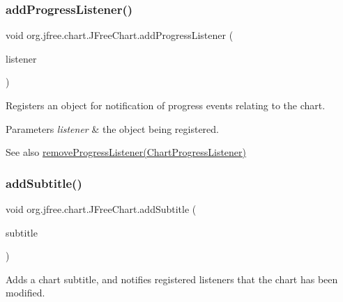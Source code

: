 \subsubsection{\texorpdfstring{add\+Progress\+Listener()}{addProgressListener()}}
{\footnotesize\ttfamily void org.\+jfree.\+chart.\+J\+Free\+Chart.\+add\+Progress\+Listener (\begin{DoxyParamCaption}\item[{\mbox{\hyperlink{interfaceorg_1_1jfree_1_1chart_1_1event_1_1_chart_progress_listener}{Chart\+Progress\+Listener}}}]{listener }\end{DoxyParamCaption})}

Registers an object for notification of progress events relating to the chart.


\begin{DoxyParams}{Parameters}
{\em listener} & the object being registered.\\
\hline
\end{DoxyParams}
\begin{DoxySeeAlso}{See also}
\mbox{\hyperlink{classorg_1_1jfree_1_1chart_1_1_j_free_chart_a4e49f1c4b7ed4328f29cac2c6a4f5a09}{remove\+Progress\+Listener(\+Chart\+Progress\+Listener)}} 
\end{DoxySeeAlso}
\mbox{\label{classorg_1_1jfree_1_1chart_1_1_j_free_chart_a511d69d8b64444f31c59761a1c7ba8f8}} 
\subsubsection{\texorpdfstring{add\+Subtitle()}{addSubtitle()}\hspace{0.1cm}{\footnotesize\ttfamily [1/2]}}
{\footnotesize\ttfamily void org.\+jfree.\+chart.\+J\+Free\+Chart.\+add\+Subtitle (\begin{DoxyParamCaption}\item[{\mbox{\hyperlink{classorg_1_1jfree_1_1chart_1_1title_1_1_title}{Title}}}]{subtitle }\end{DoxyParamCaption})}

Adds a chart subtitle, and notifies registered listeners that the chart has been modified.


